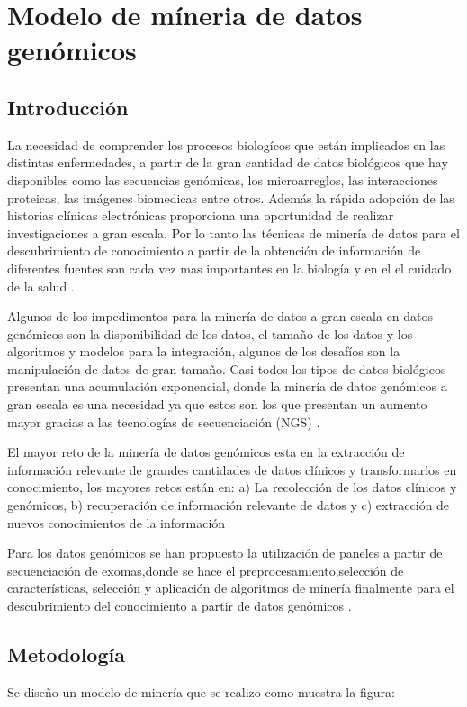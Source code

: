 \chapter{Modelo de míneria de datos genómicos}

\section{Introducción}

La necesidad de comprender los procesos biologícos que están implicados en las distintas enfermedades, a partir de la gran cantidad de datos biológicos que hay disponibles como las secuencias genómicas, los microarreglos, las interacciones proteicas, las imágenes biomedicas entre otros. Además la rápida adopción de las historias clínicas electrónicas proporciona una oportunidad de realizar investigaciones a gran escala. Por lo tanto las técnicas de minería de datos para el descubrimiento de conocimiento a partir de la obtención de información de diferentes fuentes son cada vez mas importantes en la biología y en el el cuidado de la salud \cite{Wang2017}.

Algunos de los impedimentos para la minería de datos a gran escala en datos genómicos son la disponibilidad de los datos, el tamaño de los datos y los algoritmos y modelos para la integración, algunos de los desafíos son la manipulación de datos de gran tamaño. Casi todos los tipos de datos biológicos presentan una acumulación exponencial, donde la minería de datos genómicos a gran escala es una necesidad ya que estos son los que presentan un aumento mayor gracias a las tecnologías de secuenciación (NGS) \cite{Huttenhower2010}.

El mayor reto de la minería de datos genómicos esta en la extracción de información relevante de grandes cantidades de datos clínicos y transformarlos en conocimiento, los mayores retos están en: a) La recolección de los datos clínicos y genómicos, b) recuperación de información relevante de datos y c) extracción de nuevos conocimientos de la información \cite{Farid2016}  

Para los datos genómicos se han propuesto la utilización de paneles a partir de secuenciación de exomas,donde se hace el preprocesamiento,selección de características, selección y aplicación de algoritmos de minería finalmente para el descubrimiento del conocimiento a partir de datos genómicos \cite{Farid2016}. 

\section{Metodología}

Se diseño un modelo de minería que se realizo como muestra la figura: 